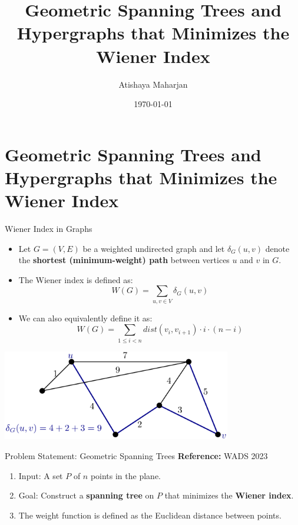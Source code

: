 \documentclass[11pt]{beamer}
\author[Atishaya Maharjan]{Atishaya Maharjan}
\title{Geometric Spanning Trees and Hypergraphs that Minimizes the Wiener Index}
\institute[]{University of Manitoba\par Geometric, Approximation, and Distributed Algorithms (GADA) lab}
\date{\today}
\begin{document}
\begin{frame}
	\titlepage
\end{frame}

\section{Geometric Spanning Trees and Hypergraphs that Minimizes the Wiener Index}

\begin{frame}{Wiener Index in Graphs}
	\begin{itemize}
		\item Let $G = (V, E)$ be a weighted undirected graph and let $\delta_G(u, v)$ denote the \textbf{shortest (minimum-weight) path}  between vertices $u$ and $v$ in $G$.
		      \pause
		\item The Wiener index is defined as:
		      \[
			      W(G) = \sum_{u, v \in V} \delta_G(u, v)
		      \]
		      \pause

		\item We can also equivalently define it as:
		      \[
			      W(G) = \sum_{1 \leq i < n} dist(v_i, v_{i+1}) \cdot i \cdot (n - i)
		      \]
	\end{itemize}
	\begin{center}
		\includegraphics[width=0.75\textwidth]{images/wiener_index.png} %
	\end{center}
\end{frame}

\begin{frame}{Problem Statement: Geometric Spanning Trees}
	\textbf{Reference:} WADS 2023 ~\cite{article:geometric_spanning_trees_minimizing_wiener_index}

	\begin{enumerate}
		\item Input: A set $P$ of $n$ points in the plane.
		      \pause
		\item Goal: Construct a \textbf{spanning tree} on $P$ that minimizes the \textbf{Wiener index}.
		      \pause
		\item The weight function is defined as the Euclidean distance between points.
	\end{enumerate}
\end{frame}
\end{document}
